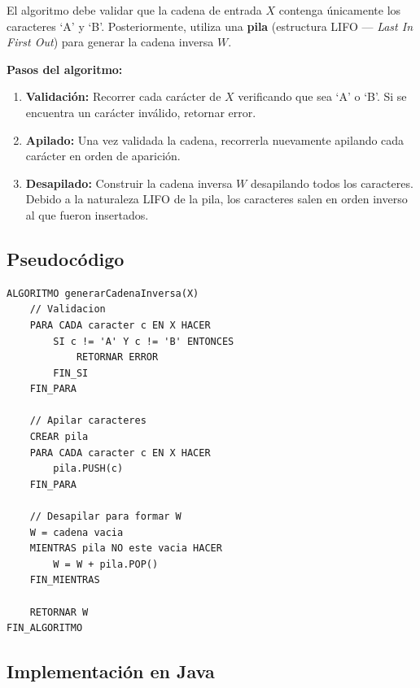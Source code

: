 \documentclass[12pt]{article}
\begin{document}
El algoritmo debe validar que la cadena de entrada $X$ contenga únicamente los caracteres `A' y `B'. Posteriormente, utiliza una \textbf{pila} (estructura LIFO --- \textit{Last In First Out}) para generar la cadena inversa $W$.

\textbf{Pasos del algoritmo:}

\begin{enumerate}
    \item \textbf{Validación:} Recorrer cada carácter de $X$ verificando que sea `A' o `B'. Si se encuentra un carácter inválido, retornar error.
    
    \item \textbf{Apilado:} Una vez validada la cadena, recorrerla nuevamente apilando cada carácter en orden de aparición.
    
    \item \textbf{Desapilado:} Construir la cadena inversa $W$ desapilando todos los caracteres. Debido a la naturaleza LIFO de la pila, los caracteres salen en orden inverso al que fueron insertados.
\end{enumerate}

\newpage
\subsection*{Pseudocódigo}

\begin{lstlisting}[style=pseudocodigo]
ALGORITMO generarCadenaInversa(X)
    // Validacion
    PARA CADA caracter c EN X HACER
        SI c != 'A' Y c != 'B' ENTONCES
            RETORNAR ERROR
        FIN_SI
    FIN_PARA
    
    // Apilar caracteres
    CREAR pila
    PARA CADA caracter c EN X HACER
        pila.PUSH(c)
    FIN_PARA
    
    // Desapilar para formar W
    W = cadena vacia
    MIENTRAS pila NO este vacia HACER
        W = W + pila.POP()
    FIN_MIENTRAS
    
    RETORNAR W
FIN_ALGORITMO
\end{lstlisting}

\newpage
\subsection*{Implementación en Java}
\end{document}
